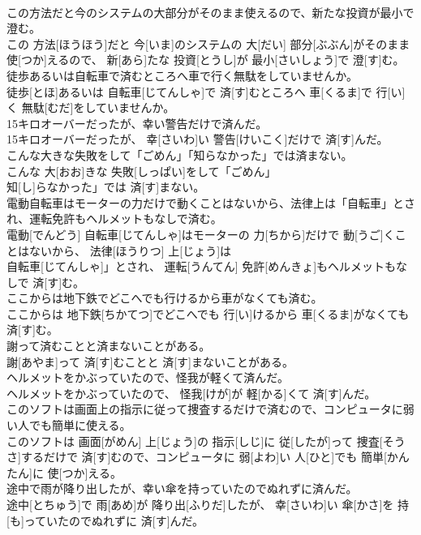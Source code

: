 \documentclass[8pt]{extreport}
\begin{document}
\begin{CJK}{UTF8}{min}
\\	この方法だと今のシステムの大部分がそのまま使えるので、新たな投資が最小で澄む。	
\\	この 方法[ほうほう]だと 今[いま]のシステムの 大[だい] 部分[ぶぶん]がそのまま 使[つか]えるので、 新[あら]たな 投資[とうし]が 最小[さいしょう]で 澄[す]む。
\\	徒歩あるいは自転車で済むところへ車で行く無駄をしていませんか。	
\\	徒歩[とほ]あるいは 自転車[じてんしゃ]で 済[す]むところへ 車[くるま]で 行[い]く 無駄[むだ]をしていませんか。
\\	15キロオーバーだったが、幸い警告だけで済んだ。	
\\	15キロオーバーだったが、 幸[さいわ]い 警告[けいこく]だけで 済[す]んだ。
\\	こんな大きな失敗をして「ごめん」「知らなかった」では済まない。	
\\	こんな 大[おお]きな 失敗[しっぱい]をして「ごめん」
\\	知[し]らなかった」では 済[す]まない。
\\	電動自転車はモーターの力だけで動くことはないから、法律上は「自転車」とされ、運転免許もヘルメットもなしで済む。	
\\	電動[でんどう] 自転車[じてんしゃ]はモーターの 力[ちから]だけで 動[うご]くことはないから、 法律[ほうりつ] 上[じょう]は
\\	自転車[じてんしゃ]」とされ、 運転[うんてん] 免許[めんきょ]もヘルメットもなしで 済[す]む。
\\	ここからは地下鉄でどこへでも行けるから車がなくても済む。	
\\	ここからは 地下鉄[ちかてつ]でどこへでも 行[い]けるから 車[くるま]がなくても 済[す]む。
\\	謝って済むことと済まないことがある。	
\\	謝[あやま]って 済[す]むことと 済[す]まないことがある。
\\	ヘルメットをかぶっていたので、怪我が軽くて済んだ。	
\\	ヘルメットをかぶっていたので、 怪我[けが]が 軽[かる]くて 済[す]んだ。
\\	このソフトは画面上の指示に従って捜査するだけで済むので、コンピュータに弱い人でも簡単に使える。	
\\	このソフトは 画面[がめん] 上[じょう]の 指示[しじ]に 従[したが]って 捜査[そうさ]するだけで 済[す]むので、コンピュータに 弱[よわ]い 人[ひと]でも 簡単[かんたん]に 使[つか]える。
\\	途中で雨が降り出したが、幸い傘を持っていたのでぬれずに済んだ。	
\\	途中[とちゅう]で 雨[あめ]が 降り出[ふりだ]したが、 幸[さいわ]い 傘[かさ]を 持[も]っていたのでぬれずに 済[す]んだ。

\end{CJK}
\end{document}
